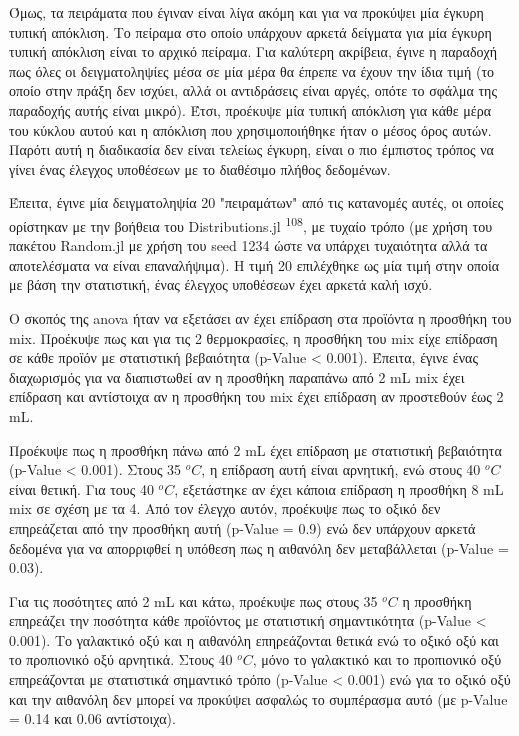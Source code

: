 \documentclass[11pt]{report}
\makeatletter
\newcommand{\citeprocitem}[2]{\hyper@linkstart{cite}{citeproc_bib_item_#1}#2\hyper@linkend}
\makeatother
\begin{document}
Όμως, τα πειράματα που έγιναν είναι λίγα ακόμη και για να προκύψει μία έγκυρη τυπική απόκλιση. Το πείραμα στο οποίο υπάρχουν αρκετά δείγματα για μία έγκυρη τυπική απόκλιση είναι το αρχικό πείραμα. Για καλύτερη ακρίβεια, έγινε η παραδοχή πως όλες οι δειγματοληψίες μέσα σε μία μέρα θα έπρεπε να έχουν την ίδια τιμή (το οποίο στην πράξη δεν ισχύει, αλλά οι αντιδράσεις είναι αργές, οπότε το σφάλμα της παραδοχής αυτής είναι μικρό). Έτσι, προέκυψε μία τυπική απόκλιση για κάθε μέρα του κύκλου αυτού και η απόκλιση που χρησιμοποιήθηκε ήταν ο μέσος όρος αυτών. Παρότι αυτή η διαδικασία δεν είναι τελείως έγκυρη, είναι ο πιο έμπιστος τρόπος να γίνει ένας έλεγχος υποθέσεων με το διαθέσιμο πλήθος δεδομένων.

Έπειτα, έγινε μία δειγματοληψία 20 "πειραμάτων" από τις κατανομές αυτές, οι οποίες ορίστηκαν με την βοήθεια του Distributions.jl \textsuperscript{\citeprocitem{108}{108}}, με τυχαίο τρόπο (με χρήση του πακέτου Random.jl με χρήση του seed 1234 ώστε να υπάρχει τυχαιότητα αλλά τα αποτελέσματα να είναι επαναλήψιμα). Η τιμή 20 επιλέχθηκε ως μία τιμή στην οποία με βάση την στατιστική, ένας έλεγχος υποθέσεων έχει αρκετά καλή ισχύ.

Ο σκοπός της \acrshort{anova} ήταν να εξετάσει αν έχει επίδραση στα προϊόντα η προσθήκη του \acrshort{mix}. Προέκυψε πως και για τις 2 θερμοκρασίες, η προσθήκη του \acrshort{mix} είχε επίδραση σε κάθε προϊόν με στατιστική βεβαιότητα (p-Value < 0.001). Έπειτα, έγινε ένας διαχωρισμός για να διαπιστωθεί αν η προσθήκη παραπάνω από 2 mL \acrshort{mix} έχει επίδραση και αντίστοιχα αν η προσθήκη του \acrshort{mix} έχει επίδραση αν προστεθούν έως 2 mL.

Προέκυψε πως η προσθήκη πάνω από 2 mL έχει επίδραση με στατιστική βεβαιότητα (p-Value < 0.001). Στους 35 \(^oC\), η επίδραση αυτή είναι αρνητική, ενώ στους 40 \(^oC\) είναι θετική. Για τους 40 \(^oC\), εξετάστηκε αν έχει κάποια επίδραση η προσθήκη 8 mL \acrshort{mix} σε σχέση με τα 4. Από τον έλεγχο αυτόν, προέκυψε πως το οξικό δεν επηρεάζεται από την προσθήκη αυτή (p-Value = 0.9) ενώ δεν υπάρχουν αρκετά δεδομένα για να απορριφθεί η υπόθεση πως η αιθανόλη δεν μεταβάλλεται (p-Value = 0.03). 

Για τις ποσότητες από 2 mL και κάτω, προέκυψε πως στους 35 \(^oC\) η προσθήκη επηρεάζει την ποσότητα κάθε προϊόντος με στατιστική σημαντικότητα (p-Value < 0.001). Το γαλακτικό οξύ και η αιθανόλη επηρεάζονται θετικά ενώ το οξικό οξύ και το προπιονικό οξύ αρνητικά. Στους 40 \(^oC\), μόνο το γαλακτικό και το προπιονικό οξύ επηρεάζονται με στατιστικά σημαντικό τρόπο (p-Value < 0.001) ενώ για το οξικό οξύ και την αιθανόλη δεν μπορεί να προκύψει ασφαλώς το συμπέρασμα αυτό (με p-Value = 0.14 και 0.06 αντίστοιχα).
\end{document}
